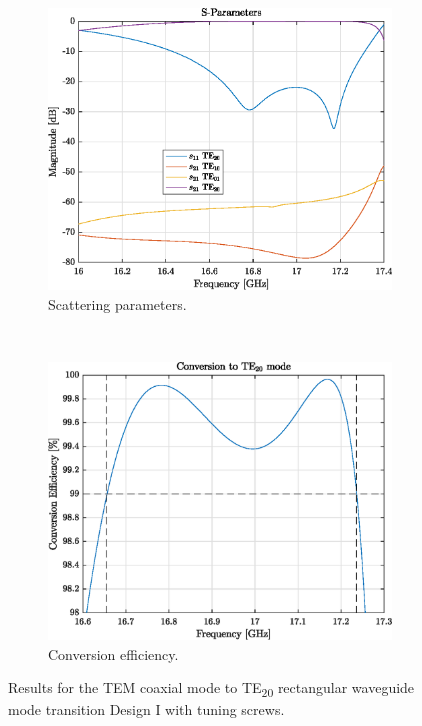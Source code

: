 \documentclass[english,twoside]{article}
\begin{document}
		\begin{figure}[H]
			\centering
			\begin{subfigure}[b]{0.48\textwidth}
				\includegraphics[width=\textwidth]{figures/coaxToWrTE20_screw}
				\caption{Scattering parameters.}
			\end{subfigure}
			~
			\begin{subfigure}[b]{0.48\textwidth}
				\includegraphics[width=\textwidth]{figures/coaxToWrTE20_screw_eff}
				\caption{Conversion efficiency.}
			\end{subfigure}
		
			\caption{Results for the TEM coaxial mode to TE\textsubscript{20} rectangular waveguide mode transition Design I with tuning screws.}
			\label{fig:coaxToWrTE20_screw}
		\end{figure}
	
\end{document}
